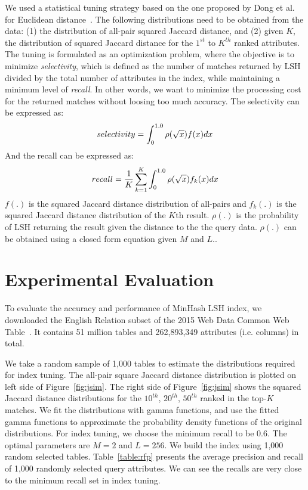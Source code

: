 \documentclass{sig-alternate}
\begin{document}
We used a statistical tuning strategy based on the one proposed by Dong et al. 
for Euclidean distance~\cite{Dong:2008:MLP:1458082.1458172}.
The following distributions need to be obtained from the data: 
(1) the distribution of all-pair squared Jaccard distance, and
(2) given $K$, the distribution of squared Jaccard distance for the
$1^{st}$ to $K^{th}$ ranked attributes.
The tuning is formulated as an optimization problem, where the objective
is to minimize {\it selectivity}, which is defined as the number of matches 
returned by LSH divided by the total number of attributes in the index, while 
maintaining a minimum level of {\it recall}. 
In other words, we want to minimize the processing cost for the returned matches
without loosing too much accuracy. 
The selectivity can be expressed as:
\begin{equation}
selectivity = \int_{0}^{1.0} \rho(\sqrt{x})f(x)dx\\
\end{equation}
And the recall can be expressed as:\\
\begin{equation}
recall = \frac{1}{K} \sum_{k=1}^{K} \int_{0}^{1.0} \rho(\sqrt{x})f_k(x)dx\\
\end{equation}
$f(.)$ is the squared Jaccard distance distribution of all-pairs and $f_k(.)$ is the squared Jaccard distance distribution of the $K$th result. 
$\rho(.)$ is the probability of LSH returning the result given the distance to the 
the query data.
$\rho(.)$ can be obtained using a closed form equation given $M$ and $L$.\cite{rp:close}.

\section{Experimental Evaluation}
To evaluate the accuracy and performance of MinHash LSH index, we downloaded the English Relation subset of the 2015 Web Data Common Web Table~\cite{Lehmberg:WWW:2016}.
It contains 51 million tables and 262,893,349 attributes (i.e. columns) in total.

We take a random sample of 1,000 tables
to estimate the distributions required for index tuning. 
The all-pair square Jaccard distance distribution is plotted on left side of Figure~\ref{fig:jsim}. The right side of Figure~\ref{fig:jsim} shows the squared Jaccard distance distributions for the $10^{th}$, $20^{th}$, $50^{th}$ ranked in the top-$K$ matches. 
We fit the distributions with gamma functions, and use the fitted gamma functions to approximate the probability density functions of the original distributions.
For index tuning, we choose the minimum recall to be 0.6.
The optimal parameters are $M = 2$ and $L = 256$.
We build the index using 1,000 random selected tables.
Table~\ref{table:rfp} presents the average precision and recall of 1,000 randomly selected
query attributes. We can see the recalls are very close to the minimum recall
set in index tuning.
\end{document}
